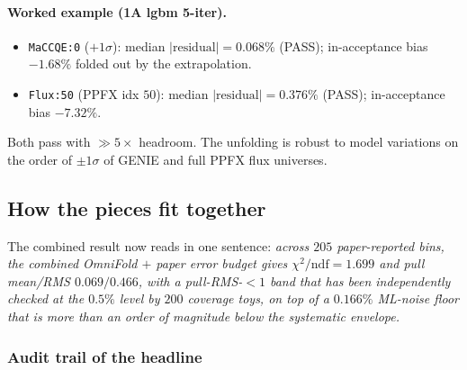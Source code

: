 \paragraph{Worked example (1A lgbm 5-iter).}
\begin{itemize}[nosep]
  \item \texttt{MaCCQE:0} ($+1\sigma$): median $|\text{residual}|=\boxed{0.068\%}$ (PASS);
        in-acceptance bias $-1.68\%$ folded out by the extrapolation.
  \item \texttt{Flux:50} (PPFX idx $50$): median $|\text{residual}|=
        \boxed{0.376\%}$ (PASS); in-acceptance bias $-7.32\%$.
\end{itemize}
Both pass with $\gg 5\times$ headroom. The unfolding is robust to
model variations on the order of $\pm 1\sigma$ of GENIE and full PPFX
flux universes.

\subsection{How the pieces fit together}
\label{sec:assemble}

The combined result now reads in one sentence:
\emph{across $205$ paper-reported bins, the
combined OmniFold $+$ paper error budget gives $\chi^{2}/\mathrm{ndf} =
1.699$ and pull mean/RMS $0.069/0.466$, with a pull-RMS-$<1$ band
that has been independently checked at the $0.5\%$ level by $200$
coverage toys, on top of a $0.166\%$ ML-noise floor that is more than
an order of magnitude below the systematic envelope.}

\subsubsection*{Audit trail of the headline}

